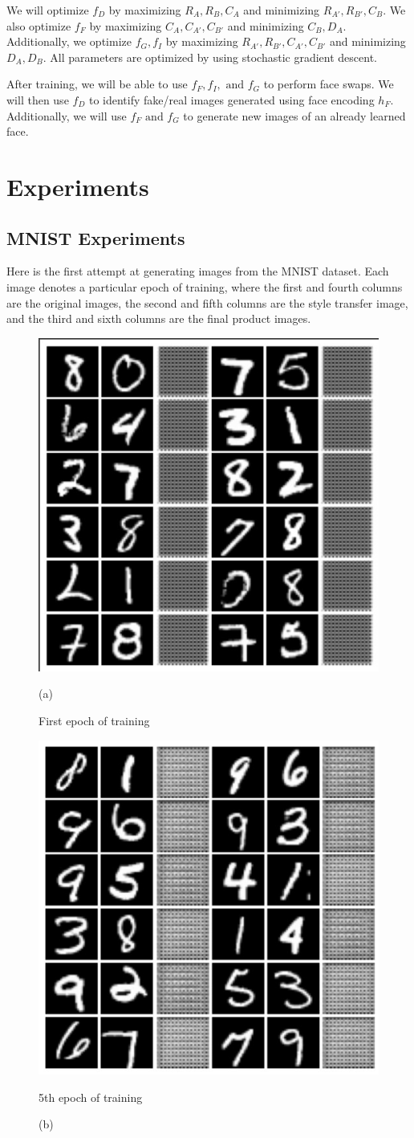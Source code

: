 \documentclass{article}
\begin{document}
We will optimize $f_D$ by maximizing $R_A, R_B, C_A$ and minimizing $R_{A'}, R_{B'}, C_B$. We also optimize $f_F$ by maximizing $C_A, C_{A'}, C_{B'}$ and minimizing $C_B, D_A$. 
Additionally, we optimize $f_G, f_I$ by maximizing $R_{A'}, R_{B'}, C_{A'}, C_{B'}$ and 
minimizing $D_A, D_B$. All parameters are optimized by using stochastic gradient descent. 

After training, we will be able to use $f_F, f_I, \text{ and } f_G$ to perform face swaps. We will then use $f_D$ to identify fake/real images generated using face encoding $h_F$. Additionally, we will use $f_F \text{ and } f_G$ to generate new images of an already learned face.

\section{Experiments}

\subsection{MNIST Experiments}

Here is the first attempt at generating images from the MNIST dataset. Each image denotes a particular epoch of training,
where the first and fourth columns are the original images, the second and fifth columns are the style transfer image, and
the third and sixth columns are the final product images.
\begin{figure}[hbt]
    \centering
    \begin{minipage}{.5\textwidth}
        \centering
        \includegraphics[width=.4\linewidth]{images/EXP5_0.jpg}
        \caption{(a)}{First epoch of training}
        \label{fig:sub1}
    \end{minipage}%
    \begin{minipage}{.5\textwidth}
        \centering
        \includegraphics[width=.4\linewidth]{images/EXP5_4.jpg}
        \caption{(b)}{5th epoch of training}
        \label{fig:sub2}
    \end{minipage}
\end{figure}
\end{document}
